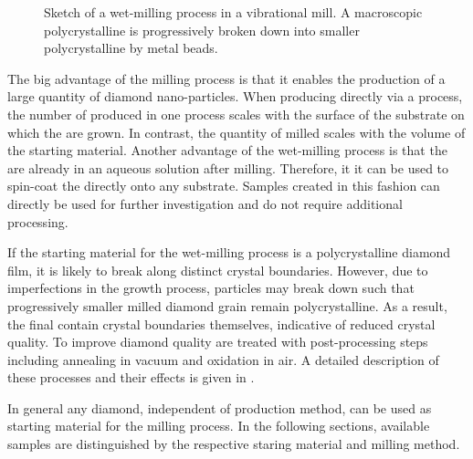 	\begin{figure}[!htb]
		\centering
		\caption[Wet-milling in a vibrational mill]{Sketch of a wet-milling process in a vibrational mill. A macroscopic polycrystalline \nd is progressively broken down into smaller polycrystalline \nds by metal beads.}\label{fig::sketch_milling}
	\end{figure}

	The big advantage of the milling process is that it enables the production of a large quantity of diamond nano-particles.
	When producing \nds directly via a \CVD process, the number of produced \nds in one process scales with the surface of the substrate on which the \nds are grown.
	In contrast, the quantity of milled \nds scales with the volume of the starting material.
	Another advantage of the wet-milling process is that the \nds are already in an aqueous solution after milling.
	Therefore, it it can be used to spin-coat the \nds directly onto any substrate. Samples created in this fashion can directly be used for further investigation and do not require additional processing.

	If the starting material for the wet-milling process is a polycrystalline diamond film, it is likely to break along distinct crystal boundaries.
	However, due to imperfections in the growth process, particles may break down such that progressively smaller milled diamond grain remain polycrystalline.
	As a result, the final \nds contain crystal boundaries themselves, indicative of reduced crystal quality.
	To improve diamond quality \nds are treated with post-processing steps including annealing in vacuum and oxidation in air.
	A detailed description of these processes and their effects is given in .

	In general any diamond, independent of production method, can be used as starting material for the milling process.
	In the following sections, available samples are distinguished by the respective staring material and milling method.

